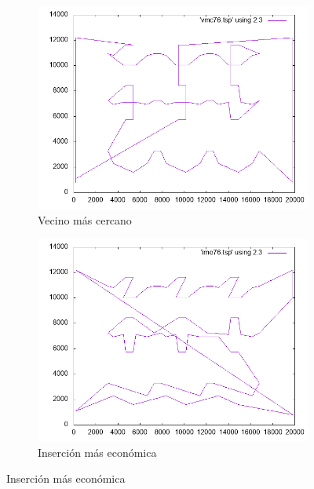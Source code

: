 \documentclass[12pt,spanish]{article}
\begin{document}
\begin{figure}[H]
\centering
\begin{subfigure}[b]{0.36\textwidth}
\includegraphics[width=\textwidth]{pr76_vmc.png}
\caption{Vecino más cercano}
\end{subfigure}
\quad
\begin{subfigure}[b]{0.36\textwidth}
\includegraphics[width=\textwidth]{pr76_ime.png}
\caption{Inserción más económica}
\end{subfigure}

\vspace{1cm}


\end{figure}
\end{document}
